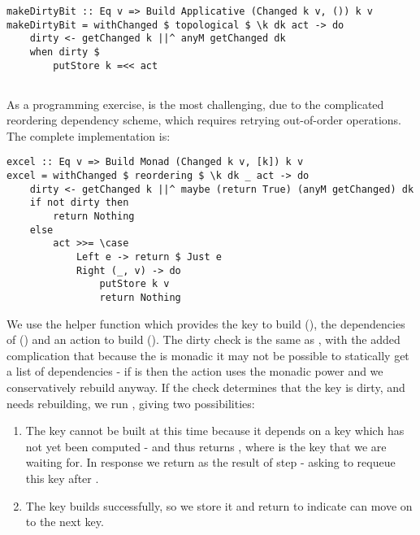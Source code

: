 \begin{verbatim}
makeDirtyBit :: Eq v => Build Applicative (Changed k v, ()) k v
makeDirtyBit = withChanged $ topological $ \k dk act -> do
    dirty <- getChanged k ||^ anyM getChanged dk
    when dirty $
        putStore k =<< act
\end{verbatim}

\subsection{\Excel}\label{sec-implementation-excel}

As a programming exercise, \Excel is the most challenging, due to the complicated reordering dependency scheme, which requires retrying out-of-order operations. The complete implementation is:

\begin{verbatim}
excel :: Eq v => Build Monad (Changed k v, [k]) k v
excel = withChanged $ reordering $ \k dk _ act -> do
    dirty <- getChanged k ||^ maybe (return True) (anyM getChanged) dk
    if not dirty then
        return Nothing
    else
        act >>= \case
            Left e -> return $ Just e
            Right (_, v) -> do
                putStore k v
                return Nothing
\end{verbatim}

We use the helper function  which provides the key to build (), the dependencies of  () and an action to build  (). The dirty check is the same as , with the added complication that because the  is monadic it may not be possible to statically get a list of dependencies - if  is  then the action uses the monadic power and we conservatively rebuild anyway. If the check determines that the key is dirty, and needs rebuilding, we run , giving two possibilities:

\begin{enumerate}
\item The key cannot be built at this time because it depends on a key which has not yet been computed - and thus  returns , where  is the key that we are waiting for. In response we return  as the result of step - asking  to requeue this key after .
\item The key builds successfully, so we store it and return  to indicate  can move on to the next key.
\end{enumerate}

